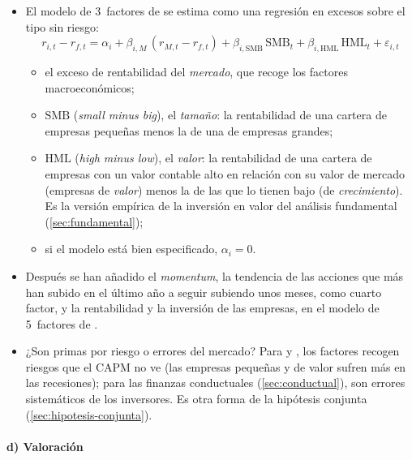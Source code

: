 \documentclass[11pt]{article}
\begin{document}
\begin{itemize}
\item El modelo de 3~factores de \textcite{FamaFrench1993} se estima como una regresión en excesos sobre el tipo sin riesgo:
  \begin{equation}\label{eq:fama-french}
  r_{i,t}-r_{f,t}=\alpha_i+\beta_{i,M}\,(r_{M,t}-r_{f,t})+\beta_{i,\mathrm{SMB}}\,\mathrm{SMB}_t+\beta_{i,\mathrm{HML}}\,\mathrm{HML}_t+\varepsilon_{i,t}
  \end{equation}
  \begin{itemize}
  \item el exceso de rentabilidad del \emph{mercado}, que recoge los factores macroeconómicos;
  \item $\mathrm{SMB}$ (\emph{small minus big}), el \emph{tamaño}: la rentabilidad de una cartera de empresas pequeñas menos la de una de empresas grandes;
  \item $\mathrm{HML}$ (\emph{high minus low}), el \emph{valor}: la rentabilidad de una cartera de empresas con un valor contable alto en relación con su valor de mercado (empresas de \emph{valor}) menos la de las que lo tienen bajo (de \emph{crecimiento}). Es la versión empírica de la inversión en valor del análisis fundamental (\ref{sec:fundamental});
  \item si el modelo está bien especificado, $\alpha_i=0$.
  \end{itemize}
\item Después se han añadido el \emph{momentum}, la tendencia de las acciones que más han subido en el último año a seguir subiendo unos meses\nocite{JegadeeshTitman1993}, como cuarto factor\nocite{Carhart1997Persistence}, y la rentabilidad y la inversión de las empresas, en el modelo de 5~factores de \textcite{FamaFrench2015Five}.
\item ¿Son primas por riesgo o errores del mercado? Para  y , los factores recogen riesgos que el CAPM no ve (las empresas pequeñas y de valor sufren más en las recesiones); para las finanzas conductuales (\ref{sec:conductual}), son errores sistemáticos de los inversores. Es otra forma de la hipótesis conjunta (\ref{sec:hipotesis-conjunta}).
\end{itemize}

\paragraph{d) Valoración}
\end{document}
